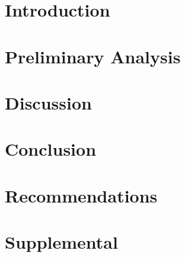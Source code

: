 
\chapter{Introduction}


\chapter{Preliminary Analysis}

\chapter{Discussion}

\chapter{Conclusion}

\chapter{Recommendations}

\chapter{Supplemental}
